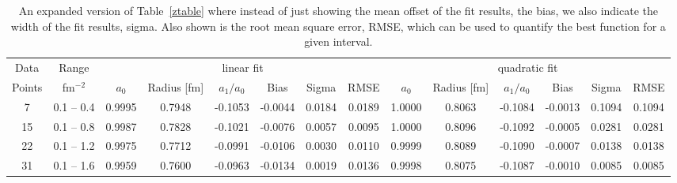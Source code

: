 \documentclass[10pt,aps,prc,twocolumn]{revtex4-1}
\begin{document}
\begin{table}
\caption{An expanded version of Table~\ref{ztable} where instead of just showing the mean offset of the 
fit results, the bias, we also indicate the width of the fit results, sigma.   Also shown is the
root mean square error, RMSE, which can be used to quantify the best function for a given interval.}
\begin{tabular}{cc|cccccc|cccccc} \hline
Data   & Range     & \multicolumn{6}{c|}{linear fit}                       & \multicolumn{6}{c}{quadratic fit}                    \\ 
Points & fm$^{-2}$ &   $a_0$  & Radius [fm]&  $a_1/a_0$ &  Bias  & Sigma &  RMSE  &   $a_0$  & Radius [fm]& $a_1/a_0$  &  Bias  & Sigma &  RMSE \\  \hline
7      & 0.1 -- 0.4 & 0.9995& 0.7948& -0.1053& -0.0044& 0.0184& 0.0189 & 1.0000& 0.8063& -0.1084& -0.0013& 0.1094& 0.1094\\
15     & 0.1 -- 0.8 & 0.9987& 0.7828& -0.1021& -0.0076& 0.0057& 0.0095 & 1.0000& 0.8096& -0.1092& -0.0005& 0.0281& 0.0281\\
22     & 0.1 -- 1.2 & 0.9975& 0.7712& -0.0991& -0.0106& 0.0030& 0.0110 & 0.9999& 0.8089& -0.1090& -0.0007& 0.0138& 0.0138\\
31     & 0.1 -- 1.6 & 0.9959& 0.7600& -0.0963& -0.0134& 0.0019& 0.0136 & 0.9998& 0.8075& -0.1087& -0.0010& 0.0085& 0.0085\\ \hline
\end{tabular}
\label{fulltable}
\end{table}
\end{document}
